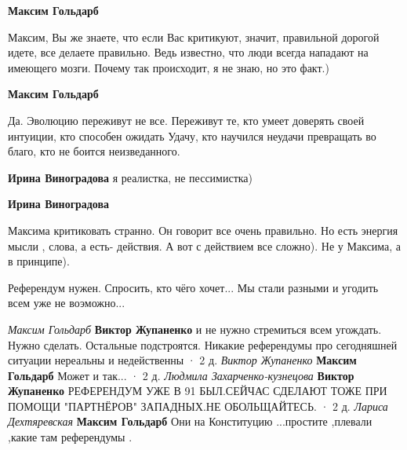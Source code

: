 \begin{itemize}
\begin{itemize}
\textbf{Максим Гольдарб} 

Максим, Вы же знаете, что если Вас критикуют, значит, правильной дорогой идете,
все делаете правильно. Ведь известно, что люди всегда нападают на имеющего
мозги. Почему так происходит, я не знаю, но это факт.)


 
\textbf{Максим Гольдарб} 

Да. Эволюцию переживут не все. Переживут те, кто умеет доверять своей интуиции,
кто способен ожидать Удачу, кто научился неудачи превращать во благо, кто не
боится неизведанного.


 
\textbf{Ирина Виноградова} я реалистка, не пессимистка)

 
\textbf{Ирина Виноградова} 

Максима критиковать странно. Он говорит все очень
правильно. Но есть энергия мысли , слова, а есть- действия. А вот с действием
все сложно). Не у Максима, а в принципе).

\end{itemize}


Референдум нужен. Спросить, кто чёго хочет... Мы стали разными и угодить всем
уже не воэможно...

\begin{itemize}
\emph{Максим Гольдарб}
\textbf{Виктор Жупаненко} и не нужно стремиться всем угождать. Нужно сделать. Остальные подстроятся. Никакие референдумы про сегодняшней ситуации нереальны и недейственны
 · 2 д.
\emph{Виктор Жупаненко}
\textbf{Максим Гольдарб} Может и так...
 · 2 д.
\emph{Людмила Захарченко-кузнецова}
\textbf{Виктор Жупаненко} РЕФЕРЕНДУМ УЖЕ В 91 БЫЛ.СЕЙЧАС СДЕЛАЮТ ТОЖЕ ПРИ ПОМОЩИ "ПАРТНЁРОВ" ЗАПАДНЫХ.НЕ ОБОЛЬЩАЙТЕСЬ.
 · 2 д.
\emph{Лариса Дехтяревская}
\textbf{Максим Гольдарб} Они на Конституцию ...простите ,плевали ,какие там референдумы .


\end{itemize}
\end{itemize}
